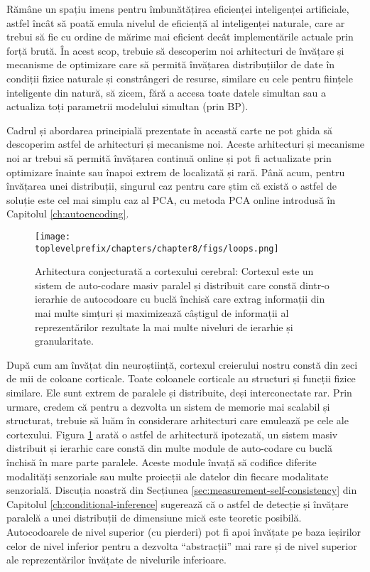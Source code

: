 \documentclass[../../book-main_ro.tex]{subfiles}
\begin{document}
Rămâne un spațiu imens pentru îmbunătățirea eficienței inteligenței artificiale, astfel încât să poată emula nivelul de eficiență al inteligenței naturale, care ar trebui să fie cu ordine de mărime mai eficient decât implementările actuale prin forță brută. În acest scop, trebuie să descoperim noi arhitecturi de învățare și mecanisme de optimizare care să permită învățarea distribuțiilor de date în condiții fizice naturale și constrângeri de resurse, similare cu cele pentru ființele inteligente din natură, să zicem, fără a accesa toate datele simultan sau a actualiza toți parametrii modelului simultan (prin BP).

Cadrul și abordarea principială prezentate în această carte ne pot ghida să descoperim astfel de arhitecturi și mecanisme noi. Aceste arhitecturi și mecanisme noi ar trebui să permită învățarea continuă online și pot fi actualizate prin optimizare înainte sau înapoi extrem de localizată și rară. Până acum, pentru învățarea unei distribuții, singurul caz pentru care știm că există o astfel de soluție este cel mai simplu caz al PCA, cu metoda PCA online introdusă în Capitolul \ref{ch:autoencoding}.

\begin{figure}[t]
\centering
\texttt{[image: \\toplevelprefix/chapters/chapter8/figs/loops.png]}
    \caption{Arhitectura conjecturată a cortexului cerebral: Cortexul este un sistem de auto-codare masiv paralel și distribuit care constă dintr-o ierarhie de autocodoare cu buclă închisă care extrag informații din mai multe simțuri și maximizează câștigul de informații al reprezentărilor rezultate la mai multe niveluri de ierarhie și granularitate.}
    \label{fig:loops}
\end{figure}
După cum am învățat din neuroștiință, cortexul creierului nostru constă din zeci de mii de coloane corticale. Toate coloanele corticale au structuri și funcții fizice similare. Ele sunt extrem de paralele și distribuite, deși interconectate rar. Prin urmare, credem că pentru a dezvolta un sistem de memorie mai scalabil și structurat, trebuie să luăm în considerare arhitecturi care emulează pe cele ale cortexului. Figura \ref{fig:loops} arată o astfel de arhitectură ipotezată, un sistem masiv distribuit și ierarhic care constă din multe module de auto-codare cu buclă închisă în mare parte paralele. Aceste module învață să codifice diferite modalități senzoriale sau multe proiecții ale datelor din fiecare modalitate senzorială. Discuția noastră din Secțiunea \ref{sec:measurement-self-consistency} din Capitolul \ref{ch:conditional-inference} sugerează că o astfel de detecție și învățare paralelă a unei distribuții de dimensiune mică este teoretic posibilă. Autocodoarele de nivel superior (cu pierderi) pot fi apoi învățate pe baza ieșirilor celor de nivel inferior pentru a dezvolta ``abstracții'' mai rare și de nivel superior ale reprezentărilor învățate de nivelurile inferioare.
\end{document}
